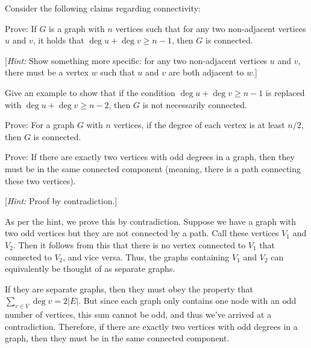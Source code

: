 \documentclass[11pt]{article}
\begin{document}
Consider the following claims regarding connectivity:
\begin{Parts}
    \Part  Prove: If $G$ is a graph with $n$ vertices such that for any two non-adjacent vertices $u$ and $v$, it holds that $\deg u + \deg v \ge n - 1$, then $G$ is connected. 
    
    [\textit{Hint:} Show something more specific: for any two non-adjacent vertices $u$ and $v$, there must be a vertex $w$ such that $u$ and $v$ are both adjacent to $w$.]

    \Part  Give an example to show that if the condition $\deg u + \deg v \ge n - 1$ is replaced with $\deg u + \deg v \ge n - 2$, then $G$ is not necessarily connected.

    \Part Prove: For a graph $G$ with $n$ vertices, if the degree of each vertex is at least $n/2$, then $G$ is connected. 





    
    \Part Prove: If there are exactly two vertices with odd degrees in a graph, then they must be in the same connected component (meaning, there is a path connecting these two vertices). 
    
    [\textit{Hint:} Proof by contradiction.]

    \begin{solution}
        As per the hint, we prove this by contradiction. Suppose we have a graph with two odd vertices but they are not connected by a path. Call these vertices $V_1$ and $V_2$. Then it follows from this that there is no vertex connected to $V_1$ that connected to $V_2$, and vice versa. Thus, the graphs containing $V_1$ and $V_2$ can equivalently be thought of as separate graphs. 

        If they are separate graphs, then they must obey the property that $\sum_{v \in V} \deg v = 2|E|$. But since each graph only contains one node with an odd number of vertices, this sum cannot be odd, and thus we've arrived at a contradiction. Therefore, if there are exactly two vertices with odd degrees in a graph, then they must be in the same connected component. 
    \end{solution}
\end{Parts}
\pagebreak 
{}
\end{document}
